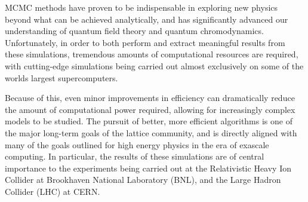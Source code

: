\documentclass[main.tex]{subfiles}
\begin{document}
%
%
%
%

MCMC methods have proven to be indispensable in exploring new physics beyond what can be achieved analytically, and has
significantly advanced our understanding of quantum field theory and quantum chromodynamics.
%
%
Unfortunately, in order to both perform and  extract meaningful results from these simulations, tremendous amounts of
computational resources are required, with cutting-edge simulations being carried out almost exclusively on some of the
worlds largest supercomputers.

%
%
Because of this, even minor improvements in efficiency can dramatically reduce the amount of computational power
required, allowing for increasingly complex models to be studied.
%
The pursuit of better, more efficient algorithms is one of the major long-term goals of the lattice community, and is
directly aligned with many of the goals outlined for high energy physics in the era of exascale computing. 
%
In particular, the results of these simulations are of central importance to the experiments being carried out at the
Relativistic Heavy Ion Collider at Brookhaven National Laboratory (BNL), and the Large Hadron Collider (LHC) at CERN.

%



%
%
\end{document}
